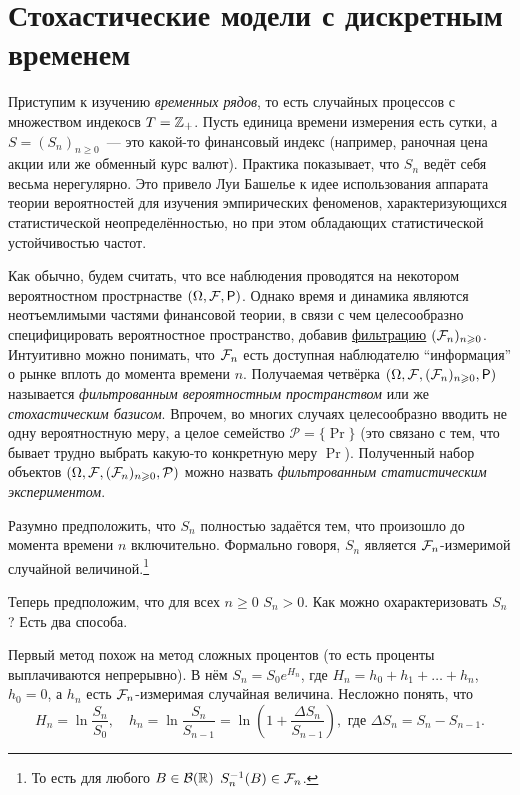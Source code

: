 \section{Стохастические модели с дискретным временем}
Приступим к изучению \emph{временных рядов}, то есть случайных процессов с 
множеством индекосв \(T = \mathbb{Z}_{+}\). Пусть единица времени измерения есть сутки, 
а \(S = (S_{n})_{n \geq 0}\)~--- это какой-то финансовый индекс (например, 
раночная цена акции или же обменный курс валют). Практика показывает, что 
\(S_{n}\) ведёт себя весьма нерегулярно. Это привело Луи Башелье к идее 
использования аппарата теории вероятностей для изучения эмпирических феноменов, 
характеризующихся статистической неопределённостью, но при этом обладающих 
статистической устойчивостью частот.

Как обычно, будем считать, что все наблюдения проводятся на некотором 
вероятностном прострнастве \((\Omega, \F, \Pr)\). Однако время и динамика 
являются неотъемлимыми частями финансовой теории, в связи с чем целесообразно 
специфицировать вероятностное пространство, добавив 
\hyperref[def-filtration]{фильтрацию} \((\mathcal{F}_{n})_{n \geqslant 0}\). Интуитивно можно 
понимать, что \(\mathcal{F}_{n}\) есть доступная наблюдателю ``информация'' о рынке 
вплоть до момента времени \(n\). Получаемая четвёрка \((\Omega, \F, (\F_{n})_{n 
\geq 0}, \Pr)\) называется \emph{фильтрованным вероятностным пространством} или 
же \emph{стохастическим базисом}. Впрочем, во многих случаях целесообразно 
вводить не одну вероятностную меру, а целое семейство \(\mathcal{P} = \{\Pr\}\) 
(это связано с тем, что бывает трудно выбрать какую-то конкретную меру 
\(\Pr\)). Полученный набор объектов \((\Omega, \mathcal{F}, (\mathcal{F}_{n})_{n \geqslant 0}, 
\mathcal{P})\) можно назвать \emph{фильтрованным статистическим экспериментом}.

Разумно предположить, что \(S_{n}\) полностью задаётся тем, что произошло до 
момента времени \(n\) включительно. Формально говоря, \(S_{n}\) является 
\(\mathcal{F}_{n}\)-измеримой случайной величиной.\footnote{То есть для любого \(B \in 
\mathcal{B}(\mathbb{R})\) \(S_{n}^{-1}(B) \in \mathcal{F}_{n}\).}

Теперь предположим, что для всех \(n \geq 0\) \(S_{n} > 0\). Как можно 
охарактеризовать \(S_{n}\)? Есть два способа.

Первый метод похож на метод сложных процентов (то есть проценты выплачиваются 
непрерывно). В нём \(S_{n} = S_{0}e^{H_{n}}\), где \(H_{n} = h_{0} + h_{1} + 
\ldots + h_{n}\), \(h_{0} = 0\), а \(h_{n}\) есть \(\mathcal{F}_{n}\)-измеримая 
случайная величина. Несложно 
понять, что
\[
	H_{n} = \ln\frac{S_{n}}{S_{0}}, \quad h_{n} = \ln\frac{S_{n}}{S_{n - 1}} = 
	\ln\left(1 + \frac{\Delta S_{n}}{S_{n - 1}}\right), \text{ где } \Delta 
	S_{n} = S_{n} - S_{n - 1}.
\]

